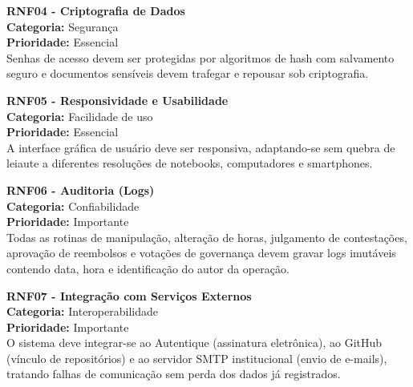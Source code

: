 \textbf{RNF04 - Criptografia de Dados}\\
\textbf{Categoria:} Segurança\\
\textbf{Prioridade:} Essencial\\
Senhas de acesso devem ser protegidas por algoritmos de hash com salvamento seguro e documentos sensíveis devem trafegar e repousar sob criptografia.

\textbf{RNF05 - Responsividade e Usabilidade}\\
\textbf{Categoria:} Facilidade de uso\\
\textbf{Prioridade:} Essencial\\
A interface gráfica de usuário deve ser responsiva, adaptando-se sem quebra de leiaute a diferentes resoluções de notebooks, computadores e smartphones.

\textbf{RNF06 - Auditoria (Logs)}\\
\textbf{Categoria:} Confiabilidade\\
\textbf{Prioridade:} Importante\\
Todas as rotinas de manipulação, alteração de horas, julgamento de contestações, aprovação de reembolsos e votações de governança devem gravar logs imutáveis contendo data, hora e identificação do autor da operação.

\textbf{RNF07 - Integração com Serviços Externos}\\
\textbf{Categoria:} Interoperabilidade\\
\textbf{Prioridade:} Importante\\
O sistema deve integrar-se ao Autentique (assinatura eletrônica), ao GitHub (vínculo de repositórios) e ao servidor SMTP institucional (envio de e-mails), tratando falhas de comunicação sem perda dos dados já registrados.
